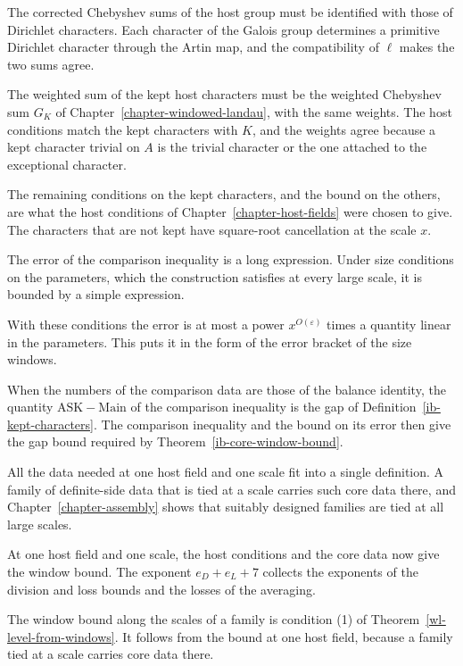 The corrected Chebyshev sums of the host group must be identified with those of
Dirichlet characters. Each character of the Galois group determines a primitive
Dirichlet character through the Artin map, and the compatibility of $\ell$ makes
the two sums agree.

The weighted sum of the kept host characters must be the weighted Chebyshev sum
$G_K$ of Chapter~\ref{chapter-windowed-landau}, with the same weights. The host
conditions match the kept characters with $K$, and the weights agree because a
kept character trivial on $A$ is the trivial character or the one attached to
the exceptional character.

The remaining conditions on the kept characters, and the bound on the others,
are what the host conditions of Chapter~\ref{chapter-host-fields} were chosen
to give. The characters that are not kept have square-root cancellation at
the scale $x$.

The error of the comparison inequality is a long expression. Under size
conditions on the parameters, which the construction satisfies at every large
scale, it is bounded by a simple expression.

With these conditions the error is at most a power $x^{O(\varepsilon)}$ times a
quantity linear in the parameters. This puts it in the form of the error
bracket of the size windows.

When the numbers of the comparison data are those of the balance identity, the
quantity $\mathrm{ASK}-\mathrm{Main}$ of the comparison inequality is the gap of
Definition~\ref{ib-kept-characters}. The comparison inequality and the bound on
its error then give the gap bound required by
Theorem~\ref{ib-core-window-bound}.

All the data needed at one host field and one scale fit into a single
definition. A family of definite-side data that is tied at a scale carries such
core data there, and Chapter~\ref{chapter-assembly} shows that suitably designed
families are tied at all large scales.

At one host field and one scale, the host conditions and the core data now give
the window bound. The exponent $e_D+e_L+7$ collects the exponents of the
division and loss bounds and the losses of the averaging.

The window bound along the scales of a family is condition (1) of
Theorem~\ref{wl-level-from-windows}. It follows from the bound at one host field,
because a family tied at a scale carries core data there.
